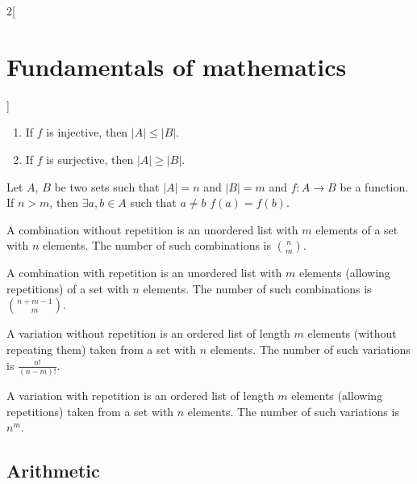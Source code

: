 \documentclass[../../../main.tex]{subfiles}
\begin{document}
\begin{multicols}{2}[\section{Fundamentals of mathematics}]
\begin{corollary}
    \begin{enumerate}
      \item If $f$ is injective, then $|A|\leq|B|$.
      \item If $f$ is surjective, then $|A|\geq|B|$.
    \end{enumerate}
  \end{corollary}
  \begin{theorem}
    Let $A$, $B$ be two sets such that $|A|=n$ and $|B|=m$ and $f:A\rightarrow B$ be a function. If $n>m$, then $\exists a,b\in A$ such that $a\ne b$ $f(a)=f(b)$.
  \end{theorem}
  \begin{proposition}
    A combination without repetition is an unordered list with $m$ elements of a set with $n$ elements. The number of such combinations is $\binom{n}{m}$.
  \end{proposition}
  \begin{proposition}
    A combination with repetition is an unordered list with $m$ elements (allowing repetitions) of a set with $n$ elements. The number of such combinations is  $\binom{n+m-1}{m}$.
  \end{proposition}
  \begin{proposition}
    A variation without repetition is an ordered list of length $m$ elements (without repeating them) taken from a set with $n$ elements. The number of such variations is $\frac{n!}{(n-m)!}$.
  \end{proposition}
  \begin{proposition}
    A variation with repetition is an ordered list of length $m$ elements (allowing repetitions) taken from a set with $n$ elements. The number of such variations is $n^m$.
  \end{proposition}
  \subsection{Arithmetic}

\end{multicols}
\end{document}
